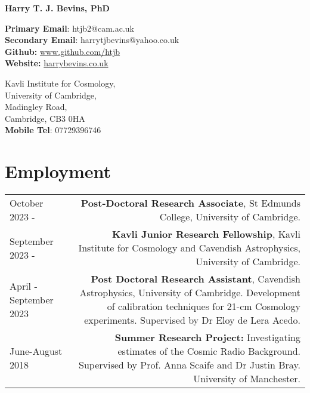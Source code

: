 \documentclass{article}
\begin{document}
\small

\begin{center}
\huge
\textbf{Harry T. J. Bevins, PhD}
\end{center}

\begin{minipage}[ht]{0.6\linewidth}
	\textbf{Primary Email}: htjb2@cam.ac.uk \\
	\textbf{Secondary Email}: harrytjbevins@yahoo.co.uk \\
	\textbf{Github:} \url{www.github.com/htjb}\\
	\textbf{Website:} \url{harrybevins.co.uk}
\end{minipage}
\begin{minipage}[ht]{0.3\linewidth}
	\begin{flushright}
	Kavli Institute for Cosmology, \\
    University of Cambridge,\\
    Madingley Road,\\
    Cambridge, CB3 0HA\\
    \textbf{Mobile Tel}: 07729396746 \\
	\end{flushright}
\end{minipage}

\section*{Employment}
\begin{tabular}{L!{\vrule}R}
    October 2023 - & \textbf{Post-Doctoral Research Associate}, St Edmunds College, University of Cambridge. \\
    September 2023 - & \textbf{Kavli Junior Research Fellowship}, Kavli Institute for Cosmology and Cavendish Astrophysics, University of Cambridge. \\
    April - September 2023 & \textbf{Post Doctoral Research Assistant}, Cavendish Astrophysics, University of Cambridge. Development of calibration techniques for 21-cm Cosmology experiments. Supervised by Dr Eloy de Lera Acedo.\\
    June-August 2018 & \textbf{Summer Research Project:} Investigating estimates of the Cosmic Radio Background. Supervised by Prof. Anna Scaife and Dr Justin Bray. University of Manchester. \\
\end{tabular}
\end{document}
